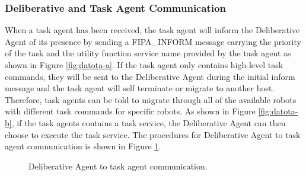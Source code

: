     \subsubsection{Deliberative and Task Agent Communication}
      When a task agent has been received, the task agent will inform the 
        Deliberative Agent of its presence by sending a FIPA\_INFORM message
        carrying the priority of the task and the utility function service 
        name provided by the task agent as shown in Figure \ref{fig:datota-a}.
      If the task agent only contains high-level task commands, they will
        be sent to the Deliberative Agent during the initial inform message
        and the task agent will self terminate or migrate to another host.
      Therefore, task agents can be told to migrate through all of the available
        robots with different task commands for specific robots.
      As shown in Figure \ref{fig:datota-b}, if the task agents contains a task 
        service, the Deliberative Agent can then choose to execute the task service.
      The procedures for Deliberative Agent to task agent communication is
        shown in Figure \ref{fig:datota}.
      \begin{figure}%
      \begin{center}
           \hspace{0.5in}
      \end{center}
      \caption{Deliberative Agent to task agent communication.}
      \label{fig:datota}
      \end{figure}

